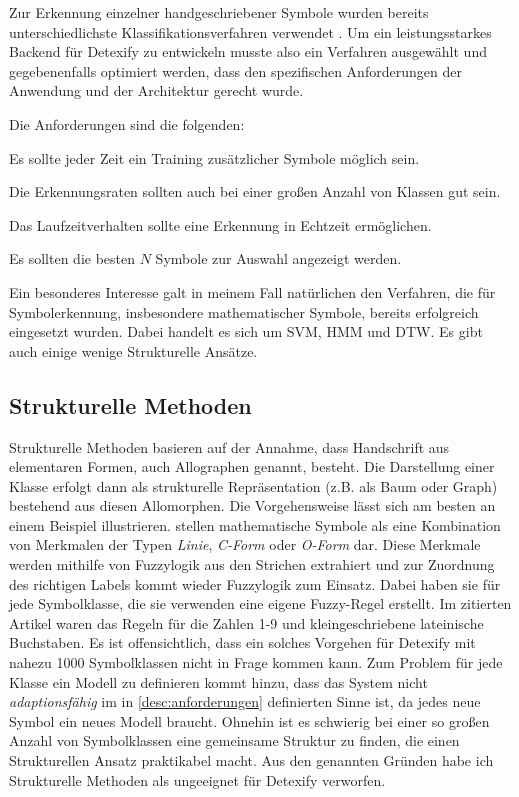 Zur Erkennung einzelner handgeschriebener Symbole wurden bereits unterschiedlichste Klassifikationsverfahren verwendet \cite{Plamondon:2000p10303}. Um ein leistungsstarkes Backend für Detexify zu entwickeln musste also ein Verfahren ausgewählt und gegebenenfalls optimiert werden, dass den spezifischen Anforderungen der Anwendung und der Architektur gerecht wurde.

Die Anforderungen sind die folgenden:
\begin{description}
  \label{desc:anforderungen} 
  \item[Adaptionsfähigkeit] Es sollte jeder Zeit ein Training zusätzlicher Symbole möglich sein. 
  \item[Skalierbarkeit] Die Erkennungsraten sollten auch bei einer großen Anzahl von Klassen gut sein. 
  \item[Laufzeitverhalten] Das Laufzeitverhalten sollte eine Erkennung in Echtzeit ermöglichen. 
  \item[Interaktivität] Es sollten die besten $N$ Symbole zur Auswahl angezeigt werden. 
\end{description}

Ein besonderes Interesse galt in meinem Fall natürlichen den Verfahren, die für Symbolerkennung, insbesondere mathematischer Symbole, bereits erfolgreich eingesetzt wurden. Dabei handelt es sich um \ac{SVM}, \ac{HMM} und \ac{DTW}. Es gibt auch einige wenige Strukturelle Ansätze.

\subsection{Strukturelle Methoden} \label{sub:strukturelle_methoden}

Strukturelle Methoden basieren auf der Annahme, dass Handschrift aus elementaren Formen, auch Allographen genannt, besteht. Die Darstellung einer Klasse erfolgt dann als strukturelle Repräsentation (z.B. als Baum oder Graph) bestehend aus diesen Allomorphen. Die Vorgehensweise lässt sich am besten an einem Beispiel illustrieren. \citet{Fitzgerald:2004p10858} stellen mathematische Symbole als eine Kombination von Merkmalen der Typen \emph{Linie}, \emph{C-Form} oder \emph{O-Form} dar. Diese Merkmale werden mithilfe von Fuzzylogik aus den Strichen extrahiert und zur Zuordnung des richtigen Labels kommt wieder Fuzzylogik zum Einsatz. Dabei haben sie für jede Symbolklasse, die sie verwenden eine eigene Fuzzy-Regel erstellt. Im zitierten Artikel waren das Regeln für die Zahlen 1-9 und kleingeschriebene lateinische Buchstaben. Es ist offensichtlich, dass ein solches Vorgehen für Detexify mit nahezu 1000 Symbolklassen nicht in Frage kommen kann. Zum Problem für jede Klasse ein Modell zu definieren kommt hinzu, dass das System nicht \emph{adaptionsfähig} im in \ref{desc:anforderungen} definierten Sinne ist, da jedes neue Symbol ein neues Modell braucht. Ohnehin ist es schwierig bei einer so großen Anzahl von Symbolklassen eine gemeinsame Struktur zu finden, die einen Strukturellen Ansatz praktikabel macht. Aus den genannten Gründen habe ich Strukturelle Methoden als ungeeignet für Detexify verworfen.

